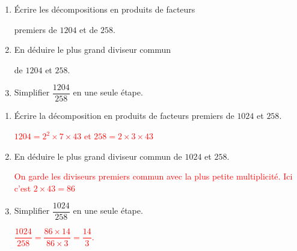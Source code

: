 \begin{exercice*}
    \begin{enumerate}
        \item Écrire les décompositions en produits de facteurs 
        
        premiers de $\num{1204}$ et de $258$.
        \item En déduire le plus grand diviseur commun 
        
        de $\num{1204}$ et $258$.
        \smallskip
        \item Simplifier $\dfrac{\num{1204}}{258}$ en une seule étape.        
    \end{enumerate}    
\end{exercice*}
\begin{corrige}
        \begin{enumerate}
            \item Écrire la décomposition en produits de facteurs premiers de $\num{1024}$ et $258$.
            
            \textcolor{red}{
                $\num{1204} = 2^2\times 7\times 43$ et $258=2\times 3\times 43$
            }
            \item En déduire le plus grand diviseur commun de $\num{1024}$ et $258$.
            
            \textcolor{red}{
                On garde les diviseurs premiers commun avec la plus petite multiplicité.
                Ici c'est $2\times 43 = 86$                
            }  
            \item Simplifier $\dfrac{\num{1024}}{258}$ en une seule étape.
            
            \textcolor{red}{
                $\dfrac{\num{1024}}{258}=\dfrac{86\times 14}{86\times 3}=\dfrac{14}{3}$.                
            }    
        \end{enumerate}       
\end{corrige}

